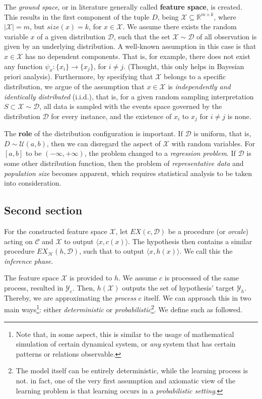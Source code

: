 The \textit{ground space}, or in literature generally called \textbf{feature space}, is created. This results in the first component of the tuple $D$, being $\mathcal{X}\subseteq \mathbb{R}^{m\times k}$, where $\lvert \mathcal{X} \rvert=m$, but $size(x)=k$, for $x\in\mathcal{X}$. We assume there exists the random variable $x$ of a given distribution $\mathcal{D}$, such that the set $\mathcal{X}\sim \mathcal{D}$ of all observation is given by an underlying distribution. A well-known assumption in this case is that $x\in\mathcal{X}$ has no dependent components. That is, for example, there does not exist any function $\psi_{x}: \{ x_{i} \}\to \{ x_{j} \}$, for $i\neq j$. (Thought, this only helps in Bayesian priori analysis). Furthermore, by specifying that $\mathcal{X}$ belongs to a specific distribution, we argue of the assumption that $x\in\mathcal{X}$ is \textit{independently and identically distributed} (i.i.d.), that is, for a given random sampling interpretation $S\subset\mathcal{X}\sim \mathcal{D}$, all data is sampled with the events space governed by the distribution $\mathcal{D}$ for every instance, and the existence of $x_{i}$ to $x_{j}$ for $i\neq j$ is none. 

The \textbf{role} of the distribution configuration is important. If $\mathcal{D}$ is uniform, that is, $D\sim \mathcal{U}(a,b)$, then we can disregard the aspect of $\mathcal{X}$ with random variables. For $[a,b]$ to be $(-\infty,+\infty)$, the problem changed to a \textit{regression problem}. If $\mathcal{D}$ is some other distribution function, then the problem of \textit{representative data} and \textit{population size} becomes apparent, which requires statistical analysis to be taken into consideration. 

\subsection{Second section}
For the constructed feature space $\mathcal{X}$, let $EX(c,\mathcal{D})$ be a procedure (or \textit{orcale}) acting on $\mathcal{C}$ and $\mathcal{X}$ to output $\langle x,c(x)\rangle$. The hypothesis then contains a similar procedure $EX_{\mathcal{H}}(h,\mathcal{D})$, such that to output $\langle x,h(x)\rangle$. We call this the \textit{inference phase}. 
    
    The feature space $\mathcal{X}$ is provided to $h$. We assume $c$ is processed of the same process, resulted in $\mathcal{Y}_{c}$. Then, $h(\mathcal{X})$ outputs the set of hypothesis' target $\mathcal{Y}_{h}$. Thereby, we are approximating the \textit{process} $c$ itself. We can approach this in two main ways\footnote{Note that, in some aspect, this is similar to the usage of mathematical simulation of certain dynamical system, or \textit{any} system that has certain patterns or relations observable.}: either \textit{deterministic} or \textit{probabilistic}\footnote{The model itself can be entirely deterministic, while the learning process is not. in fact, one of the very first assumption and axiomatic view of the learning problem is that learning occurs in a \textit{probabilistic setting}.}. We define such as followed. 

